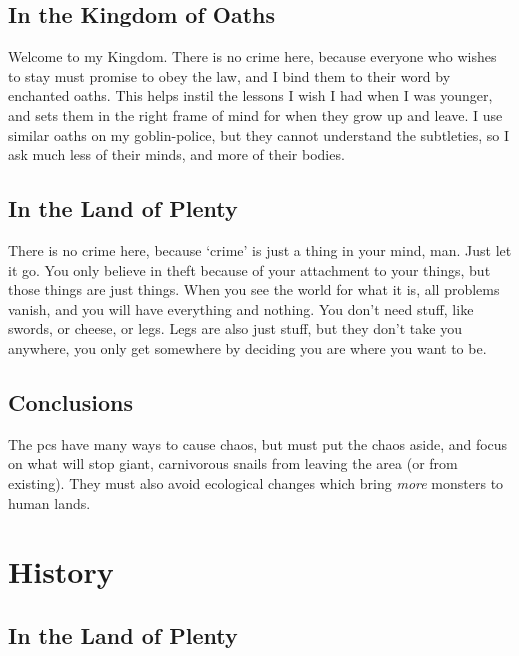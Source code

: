 \subsection{In the Kingdom of Oaths}

\begin{exampletext}
  Welcome to my Kingdom.
  There is no crime here, because everyone who wishes to stay must promise to obey the law, and I bind them to their word by enchanted oaths.
  This helps instil the lessons I wish I had when I was younger, and sets them in the right frame of mind for when they grow up and leave.
  I use similar oaths on my goblin-police, but they cannot understand the subtleties, so I ask much less of their minds, and more of their bodies.

\end{exampletext}

\subsection{In the Land of Plenty}

\begin{exampletext}
  There is no crime here, because `crime' is just a thing in your mind, man.
  Just let it go.
  You only believe in theft because of your attachment to your things, but those things are just things.
  When you see the world for what it is, all problems vanish, and you will have everything and nothing.
  You don't need stuff, like swords, or cheese, or legs.
  Legs are also just stuff, but they don't take you anywhere, you only get somewhere by deciding you are where you want to be.
\end{exampletext}

\subsection{Conclusions}

The \glspl{pc} have many ways to cause chaos, but must put the chaos aside, and focus on what will stop giant, carnivorous snails from leaving the area (or from existing).
They must also avoid ecological changes which bring \emph{more} monsters to human lands.

\section{History}

\subsection{In the Land of Plenty}

